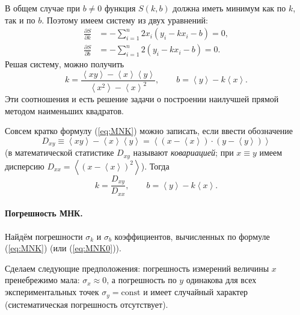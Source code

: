 \documentclass[10pt]{article}
\begin{document}
В общем случае при $b\ne0$ функция $S\left(k,b\right)$ должна иметь
минимум как по $k$, так и по $b$. Поэтому имеем систему из двух
уравнений:
\begin{align*}
\frac{\partial S}{\partial k} & =-\sum\limits _{i=1}^{n}2x_{i}\left(y_{i}-kx_{i}-b\right)=0,\\
\frac{\partial S}{\partial b} & =-\sum\limits _{i=1}^{n}2\left(y_{i}-kx_{i}-b\right)=0.
\end{align*}
Решая систему, можно получить
\begin{equation}
\boxed{k=\frac{\left\langle xy\right\rangle -\left\langle x\right\rangle \left\langle y\right\rangle }{\left\langle x^{2}\right\rangle -\left\langle x\right\rangle ^{2}},\qquad b=\left\langle y\right\rangle -k\left\langle x\right\rangle }.\label{eq:MNK}
\end{equation}
Эти соотношения и есть решение задачи о построении наилучшей прямой
методом наименьших квадратов.

{\footnotesize{}Совсем кратко формулу (\ref{eq:MNK}) можно записать,
если ввести обозначение
\begin{equation}
D_{xy}\equiv\left\langle xy\right\rangle -\left\langle x\right\rangle \left\langle y\right\rangle =\left\langle \left(x-\left\langle x\right\rangle \right)\cdot\left(y-\left\langle y\right\rangle \right)\right\rangle \label{eq:cov}
\end{equation}
(в математической статистике $D_{xy}$ называют }\emph{\footnotesize{}ковариацией}{\footnotesize{};
при $x\equiv y$ имеем дисперсию $D_{xx}=\left\langle \left(x-\left\langle x\right\rangle \right)^{2}\right\rangle $).
Тогда
\begin{equation}
k=\frac{D_{xy}}{D_{xx}},\qquad b=\left\langle y\right\rangle -k\left\langle x\right\rangle .\label{eq:MNK_short}
\end{equation}
}{\footnotesize\par}

\paragraph{Погрешность МНК.}

Найдём погрешности $\sigma_{k}$ и $\sigma_{b}$ коэффициентов, вычисленных
по формуле (\ref{eq:MNK}) (или (\ref{eq:MNK0})).

Сделаем следующие предположения: погрешность измерений величины $x$
пренебрежимо мала: $\sigma_{x}\approx0$, а погрешность по $y$ одинакова
для всех экспериментальных точек $\sigma_{y}=\mathrm{const}$ и имеет
случайный характер (систематическая погрешность отсутствует).
\end{document}
